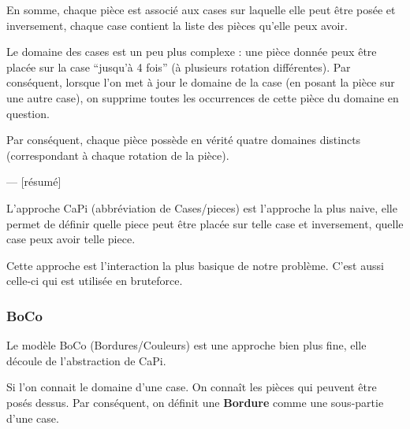 	En somme, chaque pièce est associé aux cases sur laquelle elle peut être posée et inversement, chaque case contient la liste des pièces qu'elle peux avoir.
	
	\begin{rem}
		Le domaine des cases est un peu plus complexe : une pièce donnée peux être placée sur la case \enquote{jusqu'à 4 fois} (à plusieurs rotation différentes). Par conséquent, lorsque l'on met à jour le domaine de la case (en posant la pièce sur une autre case), on supprime toutes les occurrences de cette pièce du domaine en question.
		
		Par conséquent, chaque pièce possède en vérité quatre domaines distincts (correspondant à chaque rotation de la pièce).
	\end{rem}

--- [résumé]

	L'approche CaPi (abbréviation de Cases/pieces) est l'approche la plus naive, elle permet de définir quelle piece peut être placée sur telle case et inversement, quelle case peux avoir telle piece.

	Cette approche est l'interaction la plus basique de notre problème. C'est aussi celle-ci qui est utilisée en bruteforce.

	\subsubsection{BoCo}
	
	Le modèle BoCo (Bordures/Couleurs) est une approche bien plus fine, elle découle de l'abstraction de CaPi.
	
	Si l'on connait le domaine d'une case. On connaît les pièces qui peuvent être posés dessus. Par conséquent, on définit une \textbf{Bordure} comme une sous-partie d'une case.
	

